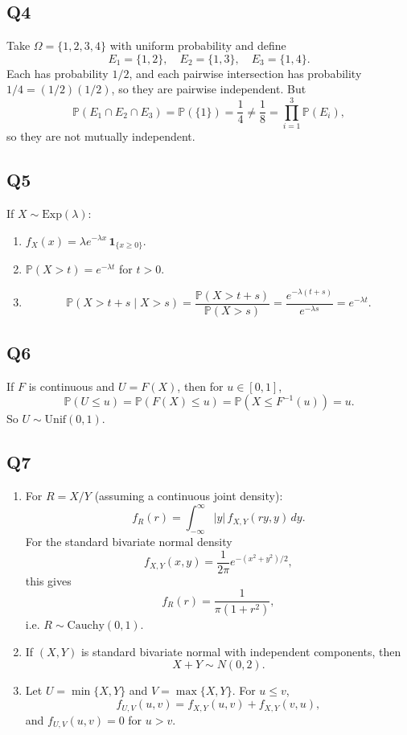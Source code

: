 \documentclass[11pt]{article}
\newcommand{\PP}{\mathbb{P}}
\newcommand{\1}{\mathbf{1}}
\begin{document}
\subsection*{Q4}
Take $\Omega=\{1,2,3,4\}$ with uniform probability and define
\[
E_1=\{1,2\},\quad E_2=\{1,3\},\quad E_3=\{1,4\}.
\]
Each has probability $1/2$, and each pairwise intersection has probability $1/4=(1/2)(1/2)$, so they are pairwise independent. But
\[
\PP(E_1\cap E_2\cap E_3)=\PP(\{1\})=\frac14\neq\frac18=\prod_{i=1}^3\PP(E_i),
\]
so they are not mutually independent.

\subsection*{Q5}
If $X\sim \mathrm{Exp}(\lambda)$:
\begin{enumerate}[label=(\alph*)]
\item $f_X(x)=\lambda e^{-\lambda x}\,\1_{\{x\ge0\}}$.
\item $\PP(X>t)=e^{-\lambda t}$ for $t>0$.
\item
\[
\PP(X>t+s\mid X>s)=\frac{\PP(X>t+s)}{\PP(X>s)}=\frac{e^{-\lambda(t+s)}}{e^{-\lambda s}}=e^{-\lambda t}.
\]
\end{enumerate}

\subsection*{Q6}
If $F$ is continuous and $U=F(X)$, then for $u\in[0,1]$,
\[
\PP(U\le u)=\PP(F(X)\le u)=\PP(X\le F^{-1}(u))=u.
\]
So $U\sim \mathrm{Unif}(0,1)$.

\subsection*{Q7}
\begin{enumerate}[label=(\alph*)]
\item For $R=X/Y$ (assuming a continuous joint density):
\[
f_R(r)=\int_{-\infty}^{\infty}|y|\,f_{X,Y}(ry,y)\,dy.
\]
For the standard bivariate normal density
\[
f_{X,Y}(x,y)=\frac1{2\pi}e^{-(x^2+y^2)/2},
\]
this gives
\[
f_R(r)=\frac1{\pi(1+r^2)},
\]
i.e. $R\sim \mathrm{Cauchy}(0,1)$.
\item If $(X,Y)$ is standard bivariate normal with independent components, then
\[
X+Y\sim N(0,2).
\]
\item Let $U=\min\{X,Y\}$ and $V=\max\{X,Y\}$. For $u\le v$,
\[
f_{U,V}(u,v)=f_{X,Y}(u,v)+f_{X,Y}(v,u),
\]
and $f_{U,V}(u,v)=0$ for $u>v$.
\end{enumerate}
\end{document}
